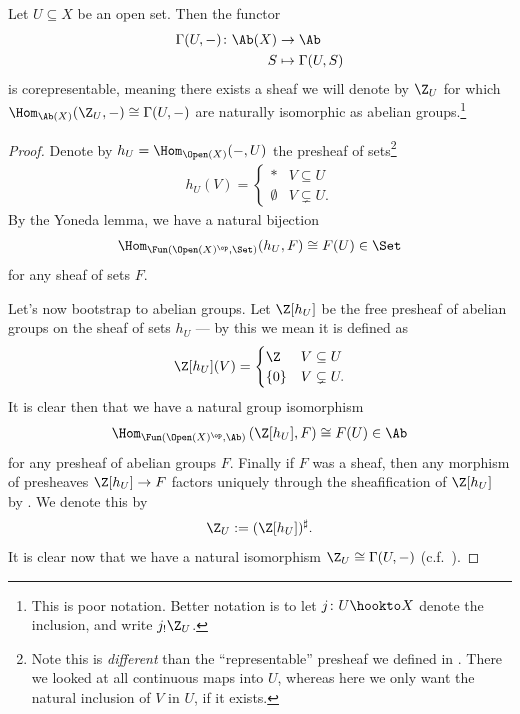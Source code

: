 \documentclass[11pt]{book}
\begin{document}
\begin{example}
\label{exa:ZU-sheaf}
Let $U \subseteq X$ be an open set. Then the functor
\begin{align*}
    \Gamma(U,-) \colon \Ab(X) &\to \Ab \\
    S &\mapsto \Gamma(U,S)
\end{align*}
is corepresentable, meaning there exists a sheaf we will denote by $\Z_U$ for which $\Hom_{\Ab(X)}(\Z_U,-) \cong \Gamma(U,-)$ are naturally isomorphic as abelian groups.\footnote{This is poor notation. Better notation is to let $j \colon U \hookto X$ denote the inclusion, and write $j_! \Z_U$.}
\end{example}
\begin{proof}
Denote by $h_U = \Hom_{\Open(X)}(-,U)$ the presheaf of sets\footnote{Note this is \emph{different} than the ``representable'' presheaf we defined in . There we looked at all continuous maps into $U$, whereas here we only want the natural inclusion of $V$ in $U$, if it exists.}
\begin{align*}
    h_U(V) = \begin{cases} \ast & V \subseteq U \\ \emptyset & V \subsetneq U. \end{cases}
\end{align*}
By the Yoneda lemma, we have a natural bijection
\begin{align*}
    \Hom_{\Fun(\Open(X)^\op,\Set)}(h_U,F) \cong F(U) \in \Set
\end{align*}
for any sheaf of sets $F$.

Let's now bootstrap to abelian groups. Let $\Z[h_U]$ be the free presheaf of abelian groups on the sheaf of sets $h_U$ --- by this we mean it is defined as
\begin{align*}
    \Z[h_U](V) = \begin{cases} \Z & V \subseteq U \\ \{0\} & V \subsetneq U. \end{cases}
\end{align*}
It is clear then that we have a natural group isomorphism
\begin{align*}
    \Hom_{\Fun(\Open(X)^\op,\Ab)} \left( \Z[h_U],F \right)\cong F(U) \in \Ab
\end{align*}
for any presheaf of abelian groups $F$. Finally if $F$ was a sheaf, then any morphism of presheaves $\Z[h_U] \to F$ factors uniquely through the sheafification of $\Z[h_U]$ by . We denote this by
\begin{align*}
    \Z_U := (\Z[h_U])^\sharp.
\end{align*}
It is clear now that we have a natural isomorphism $\Z_U\cong\Gamma(U,-)$ (c.f.~\cite[03CP,03CQ]{Stacks}).
\end{proof}
\end{document}
